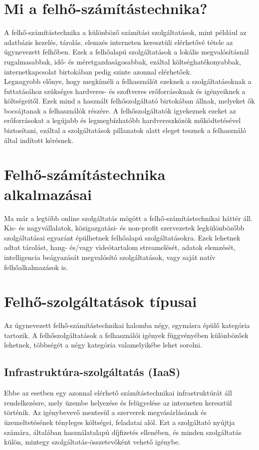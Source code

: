 \documentclass[12pt, twoside]{report}
\begin{document}
\section{Mi a felhő-számítástechnika?}
A felhő-számítástechnika a különböző számítási szolgáltatások, mint például az adatbázis kezelés, tárolás, elemzés interneten keresztüli elérhetővé tétele az úgynevezett felhőben. Ezek a felhőalapú szolgáltatások a lokális megvalósításnál rugalmasabbak, idő- és méretgazdaságosabbak, ezáltal költséghatékonyabbak, internetkapcsolat birtokában pedig szinte azonnal elérhetőek.\\
Legnagyobb előnye, hogy megkíméli a felhasználót ezeknek a szolgáltatásoknak a futtatásához szükséges hardveres- és szoftveres erőforrásoknak és igényeiknek a költségeitől. Ezek mind a használt felhőszolgáltató birtokában állnak, melyeket ők bocsájtanak a felhasználók részére. A felhőszolgáltatók igyekeznek ezeket az erőforrásokat a legújabb és legmegbízhatóbb hardvereszközök működtetésével biztosítani, ezáltal a szolgáltatások pillanatok alatt eleget tesznek a felhasználó által indított kérésnek.

\section{Felhő-számítástechnika alkalmazásai}
Ma már a legtöbb online szolgáltatás mögött a felhő-számítástechnikai háttér áll. Kis- és nagyvállalatok, közigazgatási- és non-profit szervezetek legkülönbözőbb szolgáltatásai egyaránt épülhetnek felhőalapú szolgáltatásokra. Ezek lehetnek adtat tárolást, hang- és/vagy videótartalom streamelését, adatok elemzését, intelligencia beágyazását megvalósító szolgáltatások, vagy saját natív felhőalkalmazások is.

\section{Felhő-szolgáltatások típusai}
Az úgynevezett felhő-számítástechnikai halomba négy, egymásra épülő kategória tartozik. A felhőszolgáltatások a felhasználói igények függvényében különbözőek lehetnek, többségét a négy kategória valamelyikébe lehet sorolni.
\subsection{Infrastruktúra-szolgáltatás (IaaS)}
Ebbe az esetben egy azonnal elérhető számítástechnikai infrastruktúrát áll rendelkezésre, mely üzembe helyezése és felügyelése az interneten keresztül történik. Az igénybevevő mentesül a szerverek megvásárlásának és üzemeltetésének tényleges költségei, feladatai alól. Ezt a szolgáltató nyújtja számára, általában használatalapú díjfizetés ellenében, és minden szolgáltatás külön, mintegy szolgáltatás-összetevőként vehető igénybe.
\end{document}
